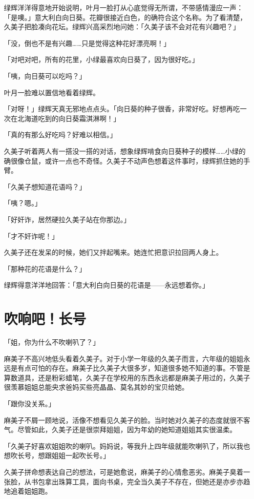 \documentclass[UTF8]{ctexart}
\begin{document}
    绿辉洋洋得意地开始说明，叶月一脸打从心底觉得无所谓，不带感情漫应一声：「是噢。」意大利白向日葵。花瓣很接近白色，的确符合这个名称。为了看清楚，久美子把脸凑向花坛。绿辉兴高采烈地问她：「久美子该不会对花有兴趣吧？」 

    「没，倒也不是有兴趣……只是觉得这种花好漂亮啊！」 

    「对吧对吧，所有的花里，小绿最喜欢向日葵了，因为很好吃。」 

    「咦，向日葵可以吃吗？」 

    叶月一脸难以置信地看着绿辉。 

    「对呀！」绿辉天真无邪地点点头。「向日葵的种子很香，非常好吃。好想再吃一次在北海道吃到的向日葵霜淇淋啊！」 

    「真的有那么好吃吗？好难以相信。」 

    久美子听着两人有一搭没一搭的对话，想象绿辉啃食向日葵种子的模样……小绿的确很像仓鼠，或许一点也不奇怪。久美子不动声色想着这件事时，绿辉抓住她的手臂。 

    「久美子想知道花语吗？」 

    「咦？嗯。」 

    「好奸诈，居然硬拉久美子站在你那边。」 

    「才不奸诈呢！」 

    久美子还在发呆的时候，她们又拌起嘴来。她连忙把意识拉回两人身上。 

    「那种花的花语是什么？」 

    绿辉得意洋洋地回答：「意大利白向日葵的花语是——永远想着你。」   

    \section{吹响吧！长号} 
    「姐，你为什么不吹喇叭了？」 

    麻美子不高兴地低头看着久美子。对于小学一年级的久美子而言，六年级的姐姐永远是有点可怕的存在。麻美子比久美子大很多岁，知道很多她不知道的事。不管是算数道具，还是粉彩蜡笔，久美子在学校用的东西永远都是麻美子用过的，久美子很羡慕姐姐总能央求爸妈买些亮晶晶、莫名其妙的宝贝给她。 

    「跟你没关系。」 

    麻美子不屑一顾地说，活像不想看见久美子的脸。当时她对久美子的态度就很不客气。尽管如此，久美子还是很崇拜姐姐，因为年幼的她知道姐姐其实很温柔。 

    「久美子好喜欢姐姐吹的喇叭。妈妈说，等我升上四年级就能吹喇叭了，所以我也想吹长号，想跟姐姐一起吹长号。」 

    久美子拼命想表达自己的想法，可是她愈说，麻美子的心情愈恶劣。麻美子臭着一张脸，从书包拿出珠算工具，面向书桌，完全当久美子不存在，但她还是亦步亦趋地追着姐姐跑。 
\end{document}
